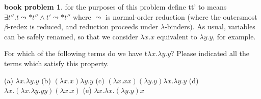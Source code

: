 \documentclass[10pt]{article}
\theoremstyle{definition}
\newtheorem{bp}{book problem}
\begin{document}
\begin{bp}
 for the purposes of this problem define  t\textdownarrow t' to means $\exists t''.t \leadsto* t'' \wedge t' \leadsto * t'' $ where $\leadsto$ is normal-order reduction (where the outersmost $\beta$-redex is reduced, and reduction proceeds under $\lambda$-binders). As usual, variables can be safely renamed, so that we consider $\lambda x.x$ equivalent to $\lambda y.y$, for example.

 For which of the following terms do we have t\textdownarrow$\lambda x.\lambda y.y$? Please indicated all the terms which satisfy this property.

 (a) $\lambda x. \lambda y.y$ \newline
 (b) $(\lambda x.x) \lambda y.y$ \newline
 (c) $( \lambda x.x x)( \lambda y.y) \lambda x. \lambda y.y$ \newline
 (d) $ \lambda x.( \lambda x. \lambda y.y y)( \lambda x.x)$ \newline
 (e) $ \lambda x.\lambda x.(\lambda y.y)x$
\end{bp}
\end{document}
